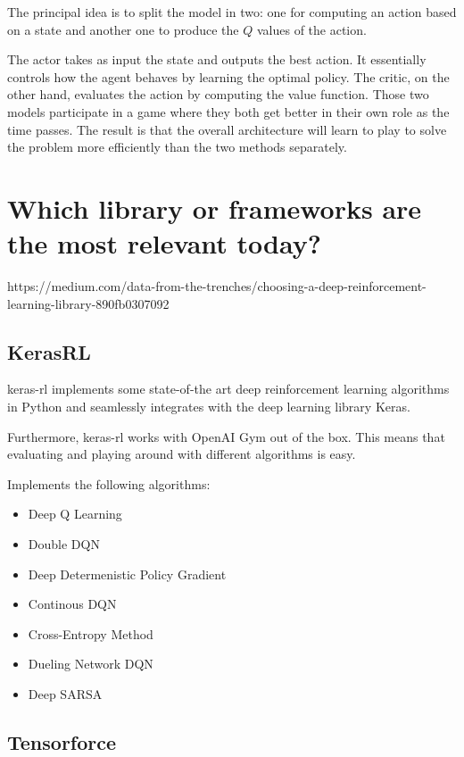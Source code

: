 \documentclass[letterpaper, 10 pt]{IEEEconf}
\begin{document}
The principal idea is to split the model in two: one for computing an
action based on a state and another one to produce the $Q$ values of the
action.

The actor takes as input the state and outputs the best action. It
essentially controls how the agent behaves by learning the optimal
policy. The critic, on the other hand, evaluates the action by
computing the value function. Those two models participate in a game
where they both get better in their own role as the time passes. The
result is that the overall architecture will learn to play to solve
the problem more efficiently than the two methods separately.


\section{Which library or frameworks are the most relevant today?}

https://medium.com/data-from-the-trenches/choosing-a-deep-reinforcement-learning-library-890fb0307092


\subsection{KerasRL}

keras-rl\cite{plappert2016kerasrl} implements some state-of-the art deep reinforcement learning
algorithms in Python and seamlessly integrates with the deep learning
library Keras.

Furthermore, keras-rl works with OpenAI Gym out of the box. This means
that evaluating and playing around with different algorithms is easy.

Implements the following algorithms:

\begin{itemize}
\item Deep Q Learning
\item Double DQN
\item Deep Determenistic Policy Gradient
\item Continous DQN
\item Cross-Entropy Method
\item Dueling Network DQN
  \item Deep SARSA
\end{itemize}

\subsection{Tensorforce}
\end{document}
